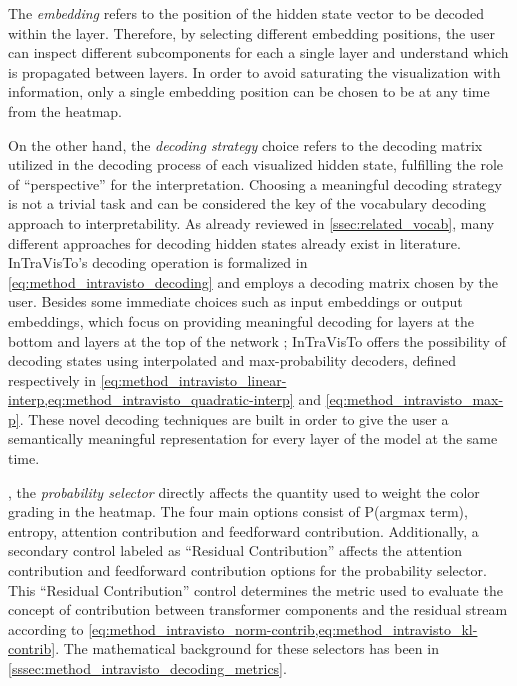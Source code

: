 The \emph{embedding} refers to the position of the hidden state vector to be decoded within the layer.
Therefore, by selecting different embedding positions, the user can inspect different subcomponents for each a single layer and understand which  is propagated between layers. 
In order to avoid saturating the visualization with information, only a single embedding position can be chosen to be  at any time from the heatmap.

On the other hand, the \emph{decoding strategy} choice refers to the decoding matrix utilized in the decoding process of each visualized hidden state, fulfilling the role of ``perspective'' for the interpretation.
Choosing a meaningful decoding strategy is not a trivial task and can be considered the key  of the vocabulary decoding approach to interpretability.
As already reviewed in \cref{ssec:related_vocab}, many different approaches for decoding hidden states already exist in literature.
InTraVisTo's decoding operation is formalized in \cref{eq:method_intravisto_decoding} and employs a decoding matrix chosen by the user.
Besides some immediate choices such as input embeddings or output embeddings, which focus on providing meaningful decoding for layers at the bottom and layers at the top of the network ; InTraVisTo offers the possibility of decoding states using interpolated and max-probability decoders, defined respectively in \cref{eq:method_intravisto_linear-interp,eq:method_intravisto_quadratic-interp} and \cref{eq:method_intravisto_max-p}.
These novel decoding techniques are built in order to give the user a semantically meaningful representation for every layer of the model at the same time.

, the \emph{probability selector} directly affects the quantity used to weight the color grading in the heatmap.
The four main options consist of P(argmax term), entropy, attention contribution and feedforward contribution.
Additionally, a secondary control labeled as ``Residual Contribution'' affects the attention contribution and feedforward contribution options for the probability selector.
This ``Residual Contribution'' control determines the metric used to evaluate the concept of contribution between transformer components and the residual stream according to \cref{eq:method_intravisto_norm-contrib,eq:method_intravisto_kl-contrib}.
The mathematical background for these selectors has been  in \cref{sssec:method_intravisto_decoding_metrics}.

